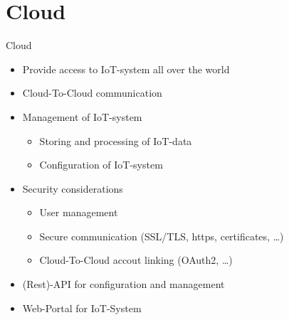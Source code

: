 ﻿\section[nosectionpage]{Cloud}

\begin{frame}{Cloud}
  \begin{description}[Cloud]
    \item[Cloud]
    \begin{itemize}
      \item Provide access to IoT-system all over the world
      \item Cloud-To-Cloud communication
      \item Management of IoT-system
      \begin{itemize}
        \item Storing and processing of IoT-data
        \item Configuration of IoT-system
      \end{itemize}
      \item Security considerations
      \begin{itemize}
        \item User management
        \item Secure communication (SSL/TLS, https, certificates, \ldots)
        \item Cloud-To-Cloud accout linking (OAuth2, \ldots)
      \end{itemize}
      \item (Rest)-API for configuration and management
      \item Web-Portal for IoT-System
    \end{itemize}
  \end{description}
\end{frame}
